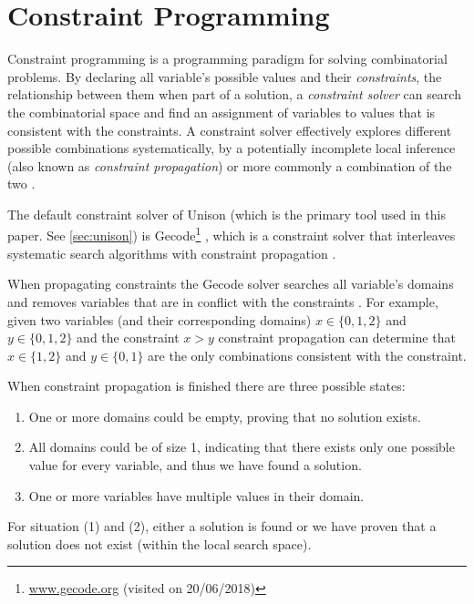 \section{Constraint Programming}
\label{sec:constraint}

Constraint programming is a programming paradigm for solving combinatorial problems.
By declaring all variable's possible values and their \textit{constraints}, the relationship
between them when part of a solution, a \textit{constraint solver} can search the combinatorial
space and find an assignment of variables to values that is consistent with the constraints.
A constraint solver effectively explores different possible combinations systematically,
by a potentially incomplete local inference (also known as \textit{constraint propagation})
or more commonly a combination of the two \cite{handbook-constraint-programming}.

The default constraint solver of Unison (which is the primary tool used in this paper.
See \ref{sec:unison}) is Gecode\footnote{\url{www.gecode.org} (visited on 20/06/2018)} \cite{unison-docs},
which is a constraint solver that interleaves systematic search algorithms with constraint
propagation \cite{MPG}.

When propagating constraints the Gecode solver searches all variable's domains and removes
variables that are in conflict with the constraints \cite[Section~23.1]{MPG}. For example,
given two variables (and their corresponding domains) $x \in \{0,1,2\}$ and $y \in \{0,1,2\}$
and the constraint $x > y$ constraint propagation can determine that $x \in \{1, 2\}$ and
$y \in \{0, 1\}$ are the only combinations consistent with the constraint.

When constraint propagation is finished there are three possible states:

\begin{enumerate}
	\item One or more domains could be empty, proving that no solution exists.
	\item	All domains could be of size 1, indicating that there exists only one possible
		value for every variable, and thus we have found a solution.
	\item One or more variables have multiple values in their domain.
\end{enumerate}

For situation (1) and (2), either a solution is found or we have proven that a solution
does not exist (within the local search space).

